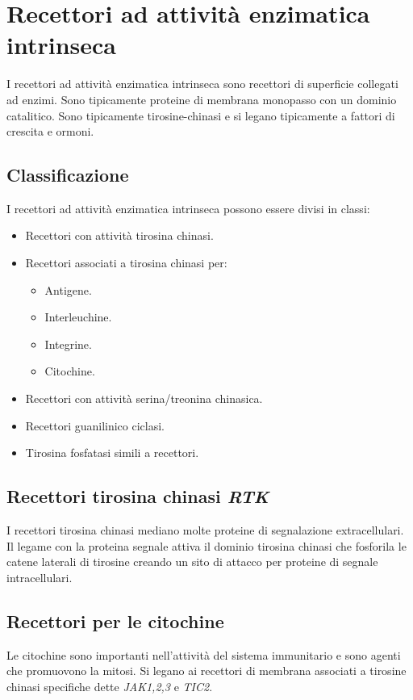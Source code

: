 \section{Recettori ad attivit\`a enzimatica intrinseca}
I recettori ad attivit\`a enzimatica intrinseca sono recettori di superficie collegati ad enzimi.
Sono tipicamente proteine di membrana monopasso con un dominio catalitico.
Sono tipicamente tirosine-chinasi e si legano tipicamente a fattori di crescita e ormoni.

	\subsection{Classificazione}
	I recettori ad attivit\`a enzimatica intrinseca possono essere divisi in classi:
	\begin{multicols}{2}
		\begin{itemize}
			\item Recettori con attivit\`a tirosina chinasi.
			\item Recettori associati a tirosina chinasi per:
				\begin{itemize}
					\item Antigene.
					\item Interleuchine.
					\item Integrine.
					\item Citochine.
				\end{itemize}
			\item Recettori con attivit\`a serina/treonina chinasica.
			\item Recettori guanilinico ciclasi.
			\item Tirosina fosfatasi simili a recettori.
		\end{itemize}
	\end{multicols}

	\subsection{Recettori tirosina chinasi \emph{RTK}}
	I recettori tirosina chinasi mediano molte proteine di segnalazione extracellulari.
	Il legame con la proteina segnale attiva il dominio tirosina chinasi che fosforila le catene laterali di tirosine creando un sito di attacco per proteine di segnale intracellulari.

	\subsection{Recettori per le citochine}
	Le citochine sono importanti nell'attivit\`a del sistema immunitario e sono agenti che promuovono la mitosi.
	Si legano ai recettori di membrana associati a tirosine chinasi specifiche dette \emph{JAK1,2,3} e \emph{TIC2}.

